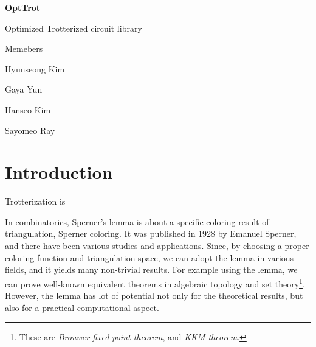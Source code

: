 \documentclass[a4paper,12pt]{article}
\newcommand{\courseName}{2024 IonQ summer Mentoring}
\newcommand{\assignmentTitle}{OptTrot}
\begin{document}
\begin{center}
    {\Large\bfseries \assignmentTitle \par}
    {\large Optimized Trotterized circuit library \par}
    \vspace{1cm}
    \vspace{0.5cm}
    {
    \noindent
    \begin{minipage}{0.45\textwidth}
        \centering
        Memebers

        Hyunseong Kim

        Gaya Yun

        Hanseo Kim
    \end{minipage}
    \begin{minipage}{0.45\textwidth}
        \centering

        Sayomeo Ray
    \end{minipage}
    }
\end{center}



\section{Introduction}

Trotterization is 

In combinatorics, Sperner's lemma is about 
a specific coloring result of triangulation, Sperner coloring. 
It was published in 1928 by Emanuel Sperner\cite{Sperner1928NeuerBF},
and there have been various studies and applications.
Since, by choosing a proper coloring function and triangulation space, 
we can adopt the lemma in various fields, and it yields many non-trivial results. 
For example using the lemma, we can prove well-known 
equivalent theorems in algebraic topology and set theory\footnote{
    These are \textit{Brouwer fixed point theorem}, and \textit{KKM theorem}.}.
However, the lemma has lot of potential not only for the theoretical results, 
but also for a practical computational aspect.
\end{document}
